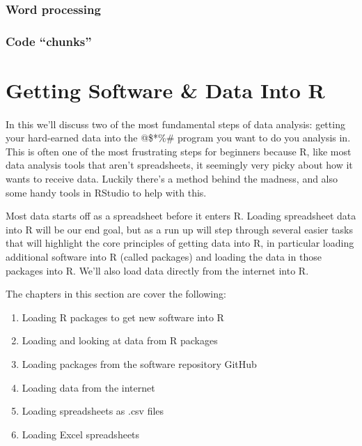 \documentclass[]{book}
\providecommand{\tightlist}{%
  \setlength{\itemsep}{0pt}\setlength{\parskip}{0pt}}
\theoremstyle{definition}
\theoremstyle{definition}
\theoremstyle{definition}
\theoremstyle{remark}
\begin{document}
\section{Word processing}\label{word-processing}

\section{\texorpdfstring{Code
``chunks''}{Code chunks}}\label{code-chunks}

\part{Getting Software \& Data Into
R}\label{part-getting-software-data-into-r}

\subsection*{}\label{section-1}

In this we'll discuss two of the most fundamental steps of data
analysis: getting your hard-earned data into the @\$*\%\# program you
want to do you analysis in. This is often one of the most frustrating
steps for beginners because R, like most data analysis tools that aren't
spreadsheets, it seemingly very picky about how it wants to receive
data. Luckily there's a method behind the madness, and also some handy
tools in RStudio to help with this.

Most data starts off as a spreadsheet before it enters R. Loading
spreadsheet data into R will be our end goal, but as a run up will step
through several easier tasks that will highlight the core principles of
getting data into R, in particular loading additional software into R
(called packages) and loading the data in those packages into R. We'll
also load data directly from the internet into R.

The chapters in this section are cover the following:

\begin{enumerate}
\def\labelenumi{\arabic{enumi}.}
\tightlist
\item
  Loading R packages to get new software into R
\item
  Loading and looking at data from R packages
\item
  Loading packages from the software repository GitHub
\item
  Loading data from the internet
\item
  Loading spreadsheets as .csv files
\item
  Loading Excel spreadsheets
\end{enumerate}
\end{document}
